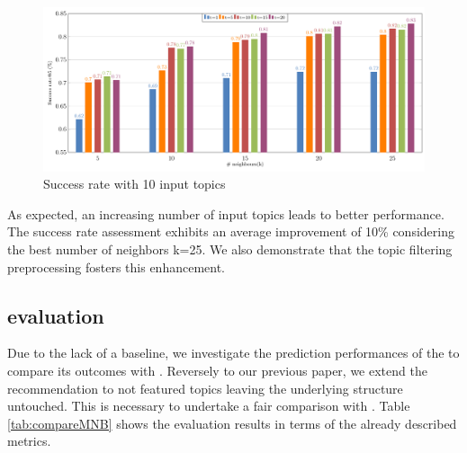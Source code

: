\begin{figure}[t!]
	\centering
	\includegraphics[width=\linewidth]{figs/successRateN@10.pdf}
	\caption{Success rate with 10 input topics}
	\label{fig:success10}
\end{figure}

As expected, an increasing number of input topics leads to better performance. The success rate assessment exhibits an average improvement of 10\% considering the best number of neighbors \ie k=25. We also demonstrate that the topic filtering preprocessing fosters this enhancement. 



\subsection{\MNB evaluation} \label{sec:EXP2}

Due to the lack of a baseline, we investigate the prediction performances of the \MNB to compare its outcomes with \CT. Reversely to our previous paper, we extend the \MNB recommendation to not featured topics leaving the underlying structure untouched. This is necessary to undertake a fair comparison with \CT. Table \ref{tab:compareMNB} shows the evaluation results in terms of the already described metrics. 


